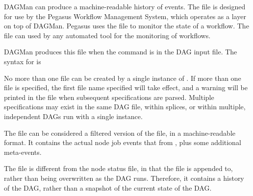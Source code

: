 DAGMan can produce a machine-readable history of events.
The  file is designed for use by the Pegasus Workflow
Management System, which operates as a layer on top of DAGMan.  Pegasus
uses the  file to monitor the state of a workflow.
The  file can used by any
automated tool for the monitoring of workflows.

DAGMan produces this file when the command  is
in the DAG input file.
The syntax for  is

 

No more than one  file can be created by a single
instance of .
If more than one  file is specified,
the first file name specified will take effect,
and a warning will be printed in the  file
when subsequent  specifications are parsed.
Multiple specifications may exist in the same DAG file, within splices,
or within multiple, independent DAGs run with a single  instance.

The  file can be considered a filtered
version of the  file, in a machine-readable format.
It contains the actual node job events that from ,
plus some additional meta-events.

The  file is different from the node status file,
in that the  file is appended to,
rather than being overwritten as the DAG runs.
Therefore, it contains a history of the DAG,
rather than a snapshot of the current state of the DAG.

